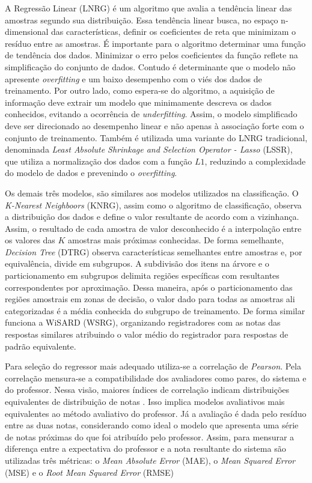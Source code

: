 A Regressão Linear (LNRG) é um algoritmo que avalia a tendência linear das amostras segundo sua distribuição. Essa tendência linear busca, no espaço n-dimensional das características, definir os coeficientes de reta que minimizam o resíduo entre as amostras. É importante para o algoritmo determinar uma função de tendência dos dados. Minimizar o erro pelos coeficientes da função reflete na simplificação do conjunto de dados. Contudo é determinante que o modelo não apresente \textit{overfitting} e um baixo desempenho com o viés dos dados de treinamento. Por outro lado, como espera-se do algoritmo, a aquisição de informação deve extrair um modelo que minimamente descreva os dados conhecidos, evitando a ocorrência de \textit{underfitting}. Assim, o modelo simplificado deve ser direcionado ao desempenho linear e não apenas à associação forte com o conjunto de treinamento. Também é utilizada uma variante do LNRG tradicional, denominada \textit{Least Absolute Shrinkage and Selection Operator - Lasso} (LSSR), que utiliza a normalização dos dados com a função $ L1 $, reduzindo a complexidade do modelo de dados e prevenindo o \textit{overfitting}.

Os demais três modelos, são similares aos modelos utilizados na classificação. O \textit{K-Nearest Neighboors} (KNRG), assim como o algoritmo de classificação, observa a distribuição dos dados e define o valor resultante de acordo com a vizinhança. Assim, o resultado de cada amostra de valor desconhecido é a interpolação entre os valores das $ K $ amostras mais próximas conhecidas. De forma semelhante, \textit{Decision Tree} (DTRG) observa características semelhantes entre amostras e, por equivalência, divide em subgrupos. A subdivisão dos itens na árvore e o particionamento em subgrupos delimita regiões específicas com resultantes correspondentes por aproximação. Dessa maneira, após o particionamento das regiões amostrais em zonas de decisão, o valor dado para todas as amostras ali categorizadas é a média conhecida do subgrupo de treinamento. De forma similar funciona a WiSARD (WSRG), organizando registradores com as notas das respostas similares atribuindo o valor médio do registrador para respostas de padrão equivalente.

Para seleção do regressor mais adequado utiliza-se a correlação de \textit{Pearson}. Pela correlação mensura-se a compatibilidade dos avaliadores como pares, do sistema e do professor. Nessa visão, maiores índices de correlação indicam distribuições equivalentes de distribuição de notas \cite{morettin2010}. Isso implica modelos avaliativos mais equivalentes ao método avaliativo do professor. Já a avaliação é dada pelo resíduo entre as duas notas, considerando como ideal o modelo que apresenta uma série de notas próximas do que foi atribuído pelo professor. Assim, para mensurar a diferença entre a expectativa do professor e a nota resultante do sistema são utilizadas três métricas: o \textit{Mean Absolute Error} (MAE), o \textit{Mean Squared Error} (MSE) e o \textit{Root Mean Squared Error} (RMSE)


